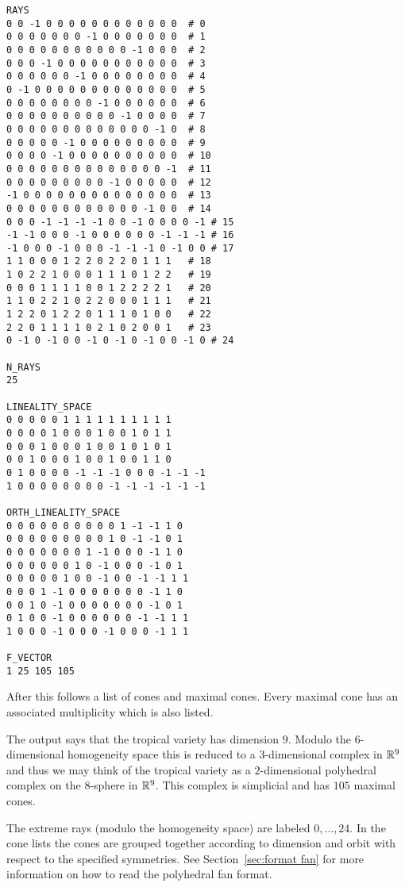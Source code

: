 \begin{example}
\begin{verbatim}
RAYS
0 0 -1 0 0 0 0 0 0 0 0 0 0 0 0	# 0
0 0 0 0 0 0 0 -1 0 0 0 0 0 0 0	# 1
0 0 0 0 0 0 0 0 0 0 0 -1 0 0 0	# 2
0 0 0 -1 0 0 0 0 0 0 0 0 0 0 0	# 3
0 0 0 0 0 0 -1 0 0 0 0 0 0 0 0	# 4
0 -1 0 0 0 0 0 0 0 0 0 0 0 0 0	# 5
0 0 0 0 0 0 0 0 -1 0 0 0 0 0 0	# 6
0 0 0 0 0 0 0 0 0 0 -1 0 0 0 0	# 7
0 0 0 0 0 0 0 0 0 0 0 0 0 -1 0	# 8
0 0 0 0 0 -1 0 0 0 0 0 0 0 0 0	# 9
0 0 0 0 -1 0 0 0 0 0 0 0 0 0 0	# 10
0 0 0 0 0 0 0 0 0 0 0 0 0 0 -1	# 11
0 0 0 0 0 0 0 0 0 -1 0 0 0 0 0	# 12
-1 0 0 0 0 0 0 0 0 0 0 0 0 0 0	# 13
0 0 0 0 0 0 0 0 0 0 0 0 -1 0 0	# 14
0 0 0 -1 -1 -1 -1 0 0 -1 0 0 0 0 -1	# 15
-1 -1 0 0 0 -1 0 0 0 0 0 0 -1 -1 -1	# 16
-1 0 0 0 -1 0 0 0 -1 -1 -1 0 -1 0 0	# 17
1 1 0 0 0 1 2 2 0 2 2 0 1 1 1	# 18
1 0 2 2 1 0 0 0 1 1 1 0 1 2 2	# 19
0 0 0 1 1 1 1 0 0 1 2 2 2 2 1	# 20
1 1 0 2 2 1 0 2 2 0 0 0 1 1 1	# 21
1 2 2 0 1 2 2 0 1 1 1 0 1 0 0	# 22
2 2 0 1 1 1 1 0 2 1 0 2 0 0 1	# 23
0 -1 0 -1 0 0 -1 0 -1 0 -1 0 0 -1 0	# 24

N_RAYS
25

LINEALITY_SPACE
0 0 0 0 0 1 1 1 1 1 1 1 1 1 1
0 0 0 0 1 0 0 0 1 0 0 1 0 1 1
0 0 0 1 0 0 0 1 0 0 1 0 1 0 1
0 0 1 0 0 0 1 0 0 1 0 0 1 1 0
0 1 0 0 0 0 -1 -1 -1 0 0 0 -1 -1 -1
1 0 0 0 0 0 0 0 0 -1 -1 -1 -1 -1 -1

ORTH_LINEALITY_SPACE
0 0 0 0 0 0 0 0 0 0 1 -1 -1 1 0
0 0 0 0 0 0 0 0 0 1 0 -1 -1 0 1
0 0 0 0 0 0 0 1 -1 0 0 0 -1 1 0
0 0 0 0 0 0 1 0 -1 0 0 0 -1 0 1
0 0 0 0 0 1 0 0 -1 0 0 -1 -1 1 1
0 0 0 1 -1 0 0 0 0 0 0 0 -1 1 0
0 0 1 0 -1 0 0 0 0 0 0 0 -1 0 1
0 1 0 0 -1 0 0 0 0 0 0 -1 -1 1 1
1 0 0 0 -1 0 0 0 -1 0 0 0 -1 1 1

F_VECTOR
1 25 105 105
\end{verbatim}
After this follows a list of cones and maximal cones.
Every maximal cone has an associated multiplicity which is also listed.

The output says that the tropical variety has dimension $9$. Modulo the
$6$-dimensional homogeneity space this is reduced to a $3$-dimensional complex in
$\mathbb{R}^9$ and thus we may think of the tropical variety as a
$2$-dimensional polyhedral complex on the $8$-sphere in $\mathbb{R}^9$. This
complex is simplicial and has $105$ maximal cones.


The extreme rays (modulo the homogeneity space) are labeled
$0,\dots,24$. In the cone lists the cones are grouped together
according to dimension and orbit with respect to the specified
symmetries. See Section~\ref{sec:format fan} for more information on how to read the
polyhedral fan format.
\end{example}

